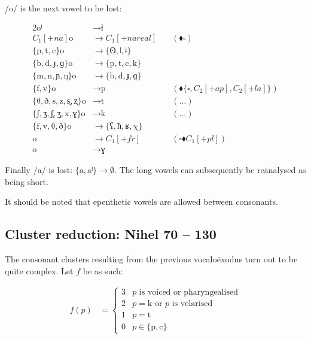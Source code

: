 \documentclass{book}
\begin{document}
/o/ is the next vowel to be lost:

\begin{alignat*}{2}
  \text{oˡ} &\rightarrow \text{ɫ} \\
  C_1[+na] \text{o} &\rightarrow C_1[+nareal] &\quad(\blacklozenge \square) \\
  \{\text{p}, \text{t}, \text{c}\} \text{o} &\rightarrow
    \{\text{ʘ}, \text{ǀ}, \text{ǂ}\} \\
  \{\text{b}, \text{d}, \text{ɟ}, \text{ɡ}\} \text{o} &\rightarrow
    \{\text{p}, \text{t}, \text{c}, \text{k}\} \\
  \{\text{m}, \text{n}, \text{ɲ}, \text{ŋ}\} \text{o} &\rightarrow
    \{\text{b}, \text{d}, \text{ɟ}, \text{ɡ}\} \\
  \{\text{f}, \text{v}\} \text{o} &\rightarrow \text{p} &\quad(\blacklozenge \{\square, C_2[+ap], C_2[+la]\}) \\
  \{\text{θ}, \text{ð}, \text{s}, \text{z}, \text{s͎}, \text{z͎}\} \text{o} &\rightarrow \text{t} &\quad(\ldots) \\
  \{\text{ʃ}, \text{ʒ}, \text{ʃ͎}, \text{ʒ͎}, \text{x}, \text{ɣ}\} \text{o} &\rightarrow \text{k} &\quad(\ldots) \\
  \{\text{f}, \text{v}, \text{θ}, \text{ð}\} \text{o} &\rightarrow
    \{\text{ʕ}, \text{ħ}, \text{ʁ}, \text{χ}\} \\
  \text{o} &\rightarrow C_1[+fr] &\quad(\square \blacklozenge C_1[+pl]) \\
  \text{o} &\rightarrow \text{ɣ}
\end{alignat*}

Finally /a/ is lost: $\{\text{a}, \text{aˡ}\} \rightarrow \emptyset$. The long vowels can subsequently be reänalysed as being short.

It should be noted that epenthetic vowels are allowed between consonants.

\subsection{Cluster reduction: Nihel 70 -- 130}

The consonant clusters resulting from the previous vocaloëxodus turn out to be quite complex. Let $f$ be as such:

\begin{align*}
  f(p) &=
  \begin{cases}
    3 & p \text{ is voiced or pharyngealised} \\
    2 & p = \text{k} \text{ or $p$ is velarised} \\
    1 & p = \text{t} \\
    0 & p \in \{\text{p}, \text{c}\}
  \end{cases}
\end{align*}
\end{document}
